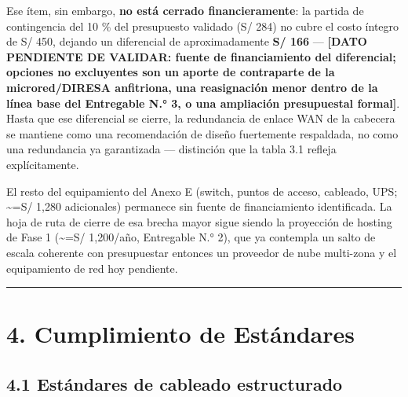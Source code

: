 \documentclass[11pt,a4paper]{article}
\begin{document}
Ese ítem, sin embargo, \textbf{no está cerrado financieramente}: la partida de contingencia del 10 \% del presupuesto validado (S/ 284) no cubre el costo íntegro de S/ 450, dejando un diferencial de aproximadamente \textbf{S/ 166} --- \textbf{{[}DATO PENDIENTE DE VALIDAR: fuente de financiamiento del diferencial; opciones no excluyentes son un aporte de contraparte de la microred/DIRESA anfitriona, una reasignación menor dentro de la línea base del Entregable N.° 3, o una ampliación presupuestal formal{]}}. Hasta que ese diferencial se cierre, la redundancia de enlace WAN de la cabecera se mantiene como una recomendación de diseño fuertemente respaldada, no como una redundancia ya garantizada --- distinción que la tabla 3.1 refleja explícitamente.

El resto del equipamiento del Anexo E (switch, puntos de acceso, cableado, UPS; \textasciitilde=S/ 1,280 adicionales) permanece sin fuente de financiamiento identificada. La hoja de ruta de cierre de esa brecha mayor sigue siendo la proyección de hosting de Fase 1 (\textasciitilde=S/ 1,200/año, Entregable N.° 2), que ya contempla un salto de escala coherente con presupuestar entonces un proveedor de nube multi-zona y el equipamiento de red hoy pendiente.

\begin{center}\rule{0.5\linewidth}{0.5pt}\end{center}

\section{4. Cumplimiento de Estándares}\label{cumplimiento-de-estuxe1ndares}

\subsection{4.1 Estándares de cableado estructurado}\label{estuxe1ndares-de-cableado-estructurado}
\end{document}

